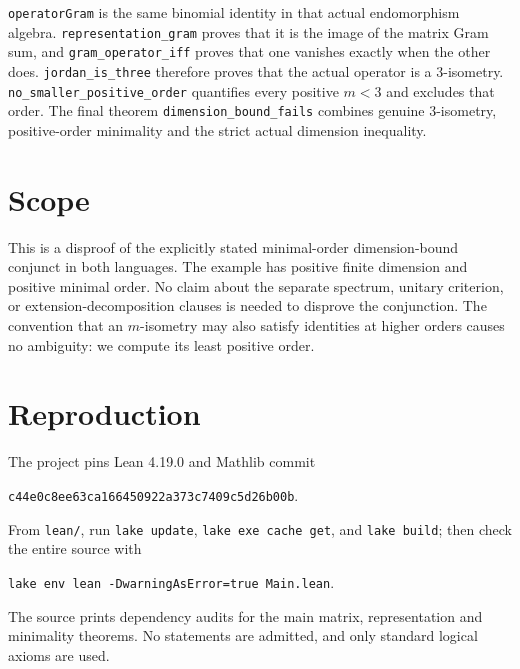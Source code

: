 \documentclass[10pt]{article}
\begin{document}
\texttt{operatorGram} is the same binomial identity in that actual
endomorphism algebra. \texttt{representation\_gram} proves that it is the
image of the matrix Gram sum, and \texttt{gram\_operator\_iff} proves
that one vanishes exactly when the other does.
\texttt{jordan\_is\_three} therefore proves that the actual operator is a
$3$-isometry. \texttt{no\_smaller\_positive\_order} quantifies every positive
$m<3$ and excludes that order. The final theorem
\texttt{dimension\_bound\_fails} combines genuine $3$-isometry,
positive-order minimality and the strict actual dimension inequality.

\section*{Scope}
This is a disproof of the explicitly stated minimal-order dimension-bound
conjunct in both languages. The example has positive finite dimension and
positive minimal order. No claim about the separate spectrum, unitary
criterion, or extension-decomposition clauses is needed to disprove the
conjunction. The convention that an $m$-isometry may also satisfy identities
at higher orders causes no ambiguity: we compute its least positive order.

\section*{Reproduction}
The project pins Lean 4.19.0 and Mathlib commit
\begin{center}\small\texttt{c44e0c8ee63ca166450922a373c7409c5d26b00b}.\end{center}
From \texttt{lean/}, run \texttt{lake update}, \texttt{lake exe cache get},
and \texttt{lake build}; then check the entire source with
\begin{center}\small\texttt{lake env lean -DwarningAsError=true Main.lean}.\end{center}
The source prints dependency audits for the main matrix, representation and
minimality theorems. No statements are admitted, and only standard logical
axioms are used.
\end{document}
